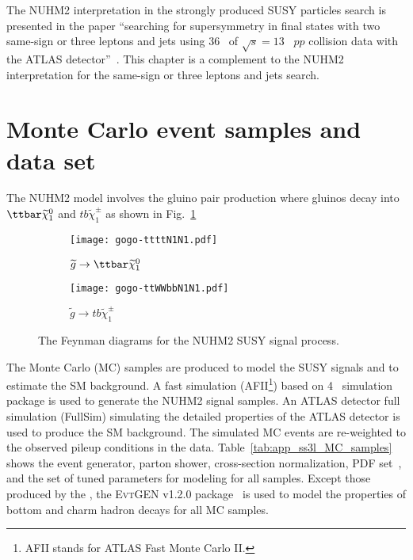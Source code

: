 The NUHM2 interpretation in the strongly produced SUSY particles search is presented in the paper ``searching for supersymmetry in final states with two same-sign or three leptons and jets using 36~{\ifb} of $\sqrt{s} = 13$~{\TeV} $pp$ collision data with the ATLAS detector''~\cite{Aaboud:2017dmy}.
This chapter is a complement to the NUHM2 interpretation for the same-sign or three leptons and jets search.


\section{Monte Carlo event samples and data set}
\label{app:ss3l_MC_samples}
The NUHM2 model involves the gluino pair production where gluinos decay into $\ttbar \widetilde{\chi}^{0}_{1}$ and $tb \widetilde{\chi}^{\pm}_{1}$ as shown in Fig.~\ref{fig:app_ss3l_feynman_diagram}

\begin{figure}[htb]
    \begin{subfigure}[b]{0.48\textwidth}
        \begin{center}
            \texttt{[image: gogo-ttttN1N1.pdf]}
            \caption{$\widetilde{g} \to \ttbar \widetilde{\chi}^{0}_{1}$}
        \end{center}
    \end{subfigure}
    \begin{subfigure}[b]{0.48\textwidth}
        \begin{center}
            \texttt{[image: gogo-ttWWbbN1N1.pdf]}
            \caption{$\widetilde{g} \to tb \widetilde{\chi}^{\pm}_{1}$}
        \end{center}
    \end{subfigure}
    \caption{The Feynman diagrams for the NUHM2 SUSY signal process.}
    \label{fig:app_ss3l_feynman_diagram}
\end{figure}

The Monte Carlo (MC) samples are produced to model the SUSY signals and to estimate the SM background.
A fast simulation (AFII\footnote{AFII stands for ATLAS Fast Monte Carlo II.}) based on {\GEANT}4~\cite{Agostinelli:2002hh} simulation package is used to generate the NUHM2 signal samples.
An ATLAS detector full simulation (FullSim) simulating the detailed properties of the ATLAS detector is used to produce the SM background.
The simulated MC events are re-weighted to the observed pileup conditions in the data.
Table~\ref{tab:app_ss3l_MC_samples} shows the event generator, parton shower, cross-section normalization, PDF set~\cite{Martin:2009iq}, and the set of tuned parameters for modeling for all samples.
Except those produced by the {\SHERPA}, the \textsc{EvtGEN}\xspace v1.2.0 package~\cite{Lange:2001uf} is used to model the properties of bottom and charm hadron decays for all MC samples.

